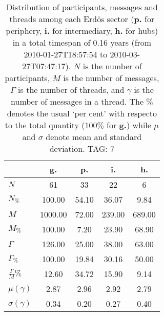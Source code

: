 \begin{table}[h!]
\begin{center}
\begin{tabular}{| l | c | c | c | c |}\hline
 & g. & p. & i. & h. \\\hline
$N$ & 61  & 33  & 22  & 6 \\\hline
$N_{\%}$ & 100.00  & 54.10  & 36.07  & 9.84 \\\hline
$M$ & 1000.00  & 72.00  & 239.00  & 689.00 \\\hline
$M_{\%}$ & 100.00  & 7.20  & 23.90  & 68.90 \\\hline
$\Gamma$ & 126.00  & 25.00  & 38.00  & 63.00 \\\hline
$\Gamma_{\%}$ & 100.00  & 19.84  & 30.16  & 50.00 \\\hline
$\frac{\Gamma}{M}\%$ & 12.60  & 34.72  & 15.90  & 9.14 \\\hline
$\mu(\gamma)$ & 2.87  & 2.96  & 2.92  & 2.79 \\\hline
$\sigma(\gamma)$ & 0.34  & 0.20  & 0.27  & 0.40 \\\hline
\end{tabular}
\caption{Distribution of participants, messages and threads among each Erd\"os sector ({\bf p.} for periphery, {\bf i.} for intermediary, 
    {\bf h.} for hubs) in a total timespan of 0.16 years (from 2010-01-27T18:57:54 to 2010-03-27T07:47:17). $N$ is the number of participants, $M$ is the number of messages, $\Gamma$ is the number of threads, and $\gamma$ is the number of messages in a thread.
    The \% denotes the usual `per cent' with respecto to the total quantity ($100\%$ for {\bf g.})
    while $\mu$ and $\sigma$ denote mean and standard deviation. TAG: 7}
\end{center}
\end{table}